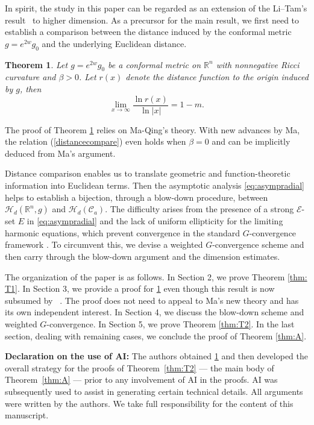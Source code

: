 \documentclass[12pt]{amsart}
\theoremstyle{plain}
\newtheorem{theorem}{Theorem}[section]
\theoremstyle{definition}
\theoremstyle{remark}     %
\numberwithin{equation}{section}
\begin{document}
In spirit, the study in this paper can be regarded as an extension of the Li--Tam's result~\cite{LT2} to higher dimension. As a precursor for the main result, we first need to  establish a comparison between  the distance induced by the conformal metric $g=e^{2w}g_0$ and the underlying Euclidean distance.

\begin{theorem} \label{thm:distance}
Let $g=e^{2w} g_0$ be a conformal metric on $\mathbb{R}^n$ with nonnegative Ricci curvature and $\beta>0$. Let $r(x)$ denote the distance function to the origin induced by $g$, then
\begin{equation} \label{distancecompare}
\lim_{x\to \infty} \frac{\ln r(x)}{\ln |x|}=1-m. 
 \end{equation} 
\end{theorem}

The proof of Theorem \ref{thm:distance} relies on Ma-Qing's theory. With new advances by Ma, the relation (\ref{distancecompare}) even holds when $\beta=0$ and can be implicitly deduced from Ma's argument. 

{Distance comparison enables us to translate geometric and function-theoretic information into Euclidean terms. Then the asymptotic analysis \cref{eq:asympradial} helps to establish a bijection, through a blow-down procedure,
between $\mathcal{H}_d(\mathbb{R}^n, g)$ and $\mathcal{H}_{d}(\mathcal{C}_a)$.
The difficulty arises from the presence of a strong $\mathcal{E}$-set $E$ in \cref{eq:asympradial} and the lack of uniform ellipticity for the limiting harmonic equations, which prevent convergence in the standard $G$-convergence framework \cite{ZKON}. To circumvent this, we devise a weighted $G$-convergence scheme and then carry through the blow-down argument and the dimension estimates.}

The organization of the paper is as follows. In Section 2, we prove Theorem \ref{thm: T1}. In Section 3, we provide a proof for \cref{thm:distance} even though this result is now subsumed by ~\cite{M}. The proof does not need to appeal to Ma's new theory and has its own independent interest. In Section 4, we discuss the blow-down scheme and weighted $G$-convergence. In Section 5, we prove Theorem \ref{thm:T2}. In the last section, dealing with remaining cases, we conclude the proof of Theorem \ref{thm:A}.

{\bf Declaration on the use of AI:}
The authors  obtained \cref{thm:distance} and then developed the overall strategy for the proofs of Theorem~\ref{thm:T2} 
---
the main body of Theorem~\ref{thm:A}
---
prior to any involvement of AI in the proofs.
AI was subsequently used to assist in generating certain technical details.
All arguments were written by the authors.
We take full responsibility  for the content of this manuscript.
\end{document}

